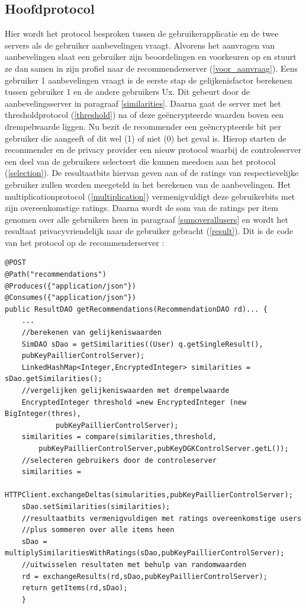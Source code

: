 \subsection{Hoofdprotocol}
Hier wordt het protocol besproken tussen de gebruikerapplicatie en de twee servers als de gebruiker aanbevelingen vraagt. Alvorens het aanvragen van aanbevelingen slaat een gebruiker zijn beoordelingen en voorkeuren op en stuurt ze dan samen in zijn profiel naar de recommenderserver (\ref{voor_aanvraag}). Eens gebruiker 1 aanbevelingen vraagt is de eerste stap de gelijkenisfactor berekenen tussen gebruiker 1 en de andere gebruikers Ux. Dit gebeurt door de aanbevelingsserver in paragraaf \ref{similarities}.  Daarna gaat de server met het thresholdprotocol (\ref{threshold}) na of deze ge\"encrypteerde waarden boven een drempelwaarde liggen. Nu bezit de recommender een ge\"encrypteerde bit per gebruiker die aangeeft of dit wel (1) of niet (0) het geval is. Hierop starten de recommender en de privacy provider een nieuw protocol waarbij de controleserver een deel van de gebruikers selecteert die kunnen meedoen aan het protocol (\ref{selection}). De resultaatbits hiervan geven aan of de ratings van respectievelijke gebruiker zullen worden meegeteld in het berekenen van de aanbevelingen. Het multiplicationprotocol (\ref{multiplication}) vermenigvuldigt deze gebruikerbits met zijn overeenkomstige ratings. Daarna wordt de som van de ratings per item genomen over alle gebruikers heen in paragraaf \ref{sumoverallusers} en wordt het resultaat privacyvriendelijk naar de gebruiker gebracht (\ref{result}). Dit is de code van het protocol op de recommenderserver : 

\begin{verbatim}
@POST
@Path("recommendations")
@Produces({"application/json"})
@Consumes({"application/json"})
public ResultDAO getRecommendations(RecommendationDAO rd)... {    
	...
    //berekenen van gelijkeniswaarden
    SimDAO sDao = getSimilarities((User) q.getSingleResult(),
    pubKeyPaillierControlServer);
    LinkedHashMap<Integer,EncryptedInteger> similarities = sDao.getSimilarities();
    //vergelijken gelijkeniswaarden met drempelwaarde
    EncryptedInteger threshold =new EncryptedInteger (new BigInteger(thres),
    		pubKeyPaillierControlServer);
    similarities = compare(similarities,threshold,
        pubKeyPaillierControlServer,pubKeyDGKControlServer.getL());
	//selecteren gebruikers door de controleserver    
    similarities =
    		HTTPClient.exchangeDeltas(simularities,pubKeyPaillierControlServer);          
    sDao.setSimilarities(similarities);
    //resultaatbits vermenigvuldigen met ratings overeenkomstige users  
    //plus sommeren over alle items heen
    sDao = multiplySimilaritiesWithRatings(sDao,pubKeyPaillierControlServer);
    //uitwisselen resultaten met behulp van randomwaarden
    rd = exchangeResults(rd,sDao,pubKeyPaillierControlServer);
    return getItems(rd,sDao);
    }
\end{verbatim}

